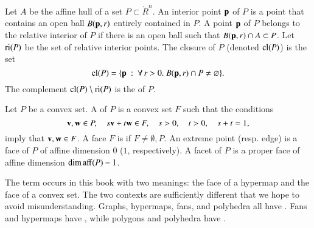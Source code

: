 \begin{definition} Let
$A$ be the affine hull of a set $P\subset\ring{R}^n$.  An interior
point ${\mathbf p}$ of $P$ is a point that contains an open ball $B({\mathbf p},r)$
entirely contained in $P$.  A point ${\mathbf p}$ of $P$ belongs to the
relative interior of $P$ if there is an open ball such that $B({\mathbf p},r)
\cap A\subset P$.  Let ${\operatorname{ri}}(P)$ be the set of relative interior
points.  The closure of $P$ (denoted ${\operatorname{cl}}(P)$) is the set
\begin{displaymath}
{\operatorname{cl}}(P) = \{{\mathbf p} \ :\  \forall\,r >0.~ B({\mathbf p},r) \cap P \ne \varnothing\}.
\end{displaymath}
The complement ${\operatorname{cl}}(P)\setminus {\operatorname{ri}}(P)$ is the
 of $P$.
\end{definition}
%
%
%
%
%
%
%

\begin{definition}
Let $P$ be a convex set.  A  of $P$ is a convex set
$F$ such that the conditions
\begin{displaymath}
{\mathbf v},{\mathbf w}\in P,\quad s {\mathbf v} + t {\mathbf w} \in F,\quad s>0,\quad t>0,\quad s+t = 1,
\end{displaymath} 
imply that ${\mathbf v},{\mathbf w}\in F$.  A face $F$ is  if $F\ne
\emptyset,P$.  An extreme point (resp. edge) is a face of $P$ of
affine dimension $0$ ($1$, respectively).  A facet of $P$ is a proper
face of affine dimension $\operatorname{dim\,aff}(P)-1$.  %
%
%
%
%
\end{definition}

\begin{remark}\label{remark:face} 
The term  occurs in this book with two meanings: the
face of a hypermap and the face of a convex set.  The two contexts
are sufficiently different that we hope to avoid misunderstanding.
Graphs, hypermaps, fans, and polyhedra all have .
Fans and hypermaps have , while polygons and
polyhedra have .
\end{remark}

